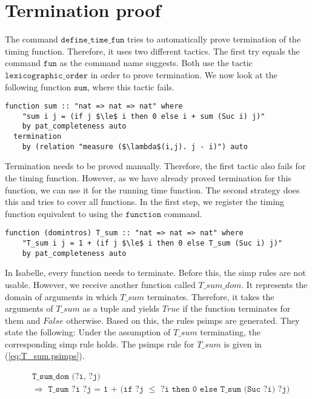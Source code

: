 

\section{Termination proof} \label{chapter:termination}

The command $\texttt{define\_time\_fun}$ tries to automatically prove termination of the timing function.
Therefore, it uses two different tactics.
The first try equals the command $\texttt{fun}$ as the command name suggests.
Both use the tactic $\texttt{lexicographic\_order}$ in order to prove termination.
We now look at the following function $\texttt{sum}$, where this tactic fails.
\begin{lstlisting}[language=isabelle,mathescape=true]
  function sum :: "nat => nat => nat" where
    "sum i j = (if j $\le$ i then 0 else i + sum (Suc i) j)"
    by pat_completeness auto
  termination
    by (relation "measure ($\lambda$(i,j). j - i)") auto
\end{lstlisting}

Termination needs to be proved manually.
Therefore, the first tactic also fails for the timing function.
However, as we have already proved termination for this function, we can use it for the running time function.
The second strategy does this and tries to cover all functions.
In the first step, we register the timing function equivalent to using the $\texttt{function}$ command.
\begin{lstlisting}[language=isabelle,mathescape=true,caption=Function registration,label=lst:sum_reg]
  function (domintros) T_sum :: "nat => nat => nat" where
    "T_sum i j = 1 + (if j $\le$ i then 0 else T_sum (Suc i) j)"
    by pat_completeness auto
\end{lstlisting}
In Isabelle, every function needs to terminate.
Before this, the simp rules are not usable.
However, we receive another function called $T\_sum\_dom$.
It represents the domain of arguments in which $T\_sum$ terminates.
Therefore, it takes the arguments of $T\_sum$ as a tuple and yields $True$ if the function terminates for them and $False$ otherwise.
Based on this, the rules psimps are generated.
They state the following: Under the assumption of $T\_sum$ terminating, the corresponding simp rule holds.
The psimps rule for $T\_sum$ is given in (\ref{eq:T_sum.psimps}).

\begin{equation}
  \begin{aligned}
  &\texttt{T\_sum\_dom (?i, ?j)}\\
  &\texttt{$\Longrightarrow$ T\_sum ?i ?j = 1 + (if ?j $\le$ ?i then 0 else T\_sum (Suc ?i) ?j)}
  \end{aligned}
  \label{eq:T_sum.psimps}
\end{equation}

